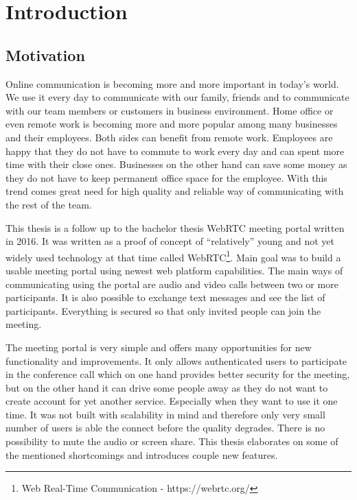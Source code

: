 \documentclass[
  digital, %
  table,   %
  lof,     %
  nolot,     %
]{fithesis3}
\begin{document}
\chapter{Introduction}
\section{Motivation}
Online communication is becoming more and more important in today’s world. We use it every day to communicate with our family, friends and to communicate with our team members or customers in business environment. Home office or even remote work is becoming more and more popular among many businesses and their employees. Both sides can benefit from remote work. Employees are happy that they do not have to commute to work every day and can spent more time with their close ones. Businesses on the other hand can save some money as they do not have to keep permanent office space for the employee. With this trend comes great need for high quality and reliable way of communicating with the rest of the team.

This thesis is a follow up to the bachelor thesis WebRTC meeting portal  \cite{bachelorThesis} written in 2016. It was written as a proof of concept of “relatively” young and not yet widely used technology at that time called WebRTC\footnote{Web Real-Time Communication - https://webrtc.org/
}. Main goal was to build a usable meeting portal using newest web platform capabilities. The main ways of communicating using the portal are audio and video calls between two or more participants. It is also possible to exchange text messages and see the list of participants. Everything is secured so that only invited people can join the meeting.

The meeting portal is very simple and offers many opportunities for new functionality and improvements. It only allows authenticated users to participate in the conference call which on one hand provides better security for the meeting, but on the other hand it can drive some people away as they do not want to create account for yet another service. Especially when they want to use it one time. It was not built with scalability in mind and therefore only very small number of users is able the connect before the quality degrades. There is no possibility to mute the audio or screen share. This thesis elaborates on some of the mentioned shortcomings and introduces couple new features.
\end{document}
